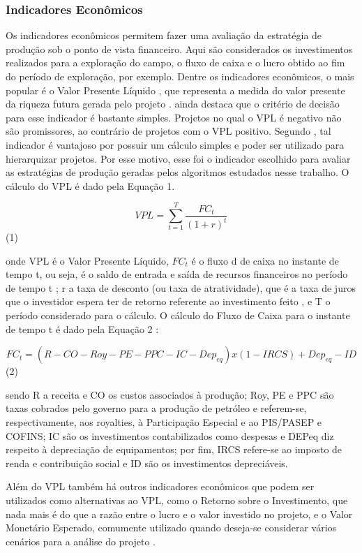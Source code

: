 \subsubsection{Indicadores Econômicos}
\label{indicadoresEconomicos}
Os indicadores econômicos permitem fazer uma avaliação da estratégia de produção sob o ponto de vista financeiro. Aqui são considerados os investimentos realizados para a exploração do campo, o fluxo de caixa e o lucro obtido ao fim do período de exploração, por exemplo. Dentre os indicadores econômicos, o mais popular é o Valor Presente Líquido \cite{Neves2004, Nogueira2009, Marques2012, Barreto2014}, que representa a medida do valor presente da riqueza futura gerada pelo projeto \cite{Puccini2011}.  ainda destaca que o critério de decisão para esse indicador é bastante simples. Projetos no qual o VPL é negativo não são promissores, ao contrário de projetos com o VPL positivo. Segundo , tal indicador é vantajoso por possuir um cálculo simples e poder ser utilizado para hierarquizar projetos. Por esse motivo, esse foi o indicador escolhido para avaliar as estratégias de produção geradas pelos algoritmos estudados nesse trabalho.  O cálculo do VPL é dado pela Equação 1.


$$ VPL = \sum_{t=1}^{T} \frac{FC_t}{(1+r)^t} $$ (1)

onde VPL é o Valor Presente Líquido, $FC_t$  é o fluxo d de caixa no instante de tempo t, ou seja, é o saldo de entrada e saída de recursos financeiros no período de tempo t \cite{Neves2004}; r a taxa de desconto (ou taxa de atratividade), que é a taxa de juros que o investidor espera ter de retorno referente ao investimento feito \cite{Puccini2011},  e T o período considerado para o cálculo. O cálculo do Fluxo de Caixa para o instante de tempo t é dado pela Equação 2 \cite{Silva2016}:

$$ FC_t = (R-CO-Roy-PE-PPC-IC- Dep_{eq} )x(1-IRCS)+ Dep_{eq} - ID $$ (2)
 
sendo R a receita e CO os custos associados à produção; Roy, PE e PPC são taxas cobrados pelo governo para a produção de petróleo e referem-se, respectivamente, aos royalties, à Participação Especial e ao PIS/PASEP e COFINS; IC são os investimentos contabilizados como despesas e DEPeq diz respeito à depreciação de equipamentos; por fim, IRCS refere-se ao imposto de renda e contribuição social e ID são os investimentos depreciáveis.

Além do VPL também há outros indicadores econômicos que podem ser utilizados como alternativas ao VPL, como o Retorno sobre o Investimento, que nada mais é do que a razão entre o lucro e o valor investido no projeto, e o Valor Monetário Esperado, comumente utilizado quando deseja-se considerar vários cenários para a análise do projeto \cite{Marques2012}.

